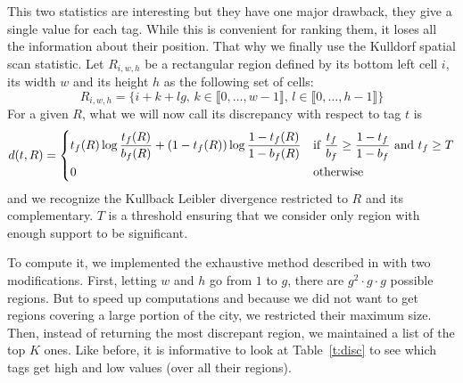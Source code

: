 This two statistics are interesting but they have one major drawback, they
give a single value for each tag. While this is convenient for ranking them,
it loses all the information about their position. That why we finally use the
Kulldorf spatial scan statistic\cite{kulldorff}. Let $R_{i,w,h}$ be a
rectangular region defined by its bottom left cell $i$, its width $w$ and its
height $h$ as the following set of cells: \[R_{i,w,h} = \{i + k + lg,\,
k\in\llbracket 0,\dots, w-1\rrbracket,\, l\in\llbracket 0,\dots,
h-1\rrbracket\}\] For a given $R$, what we will now call its discrepancy with
respect to tag $t$ is
\[
	d(t, R) =
\begin{dcases}
	t_f(R)\log\frac{t_f(R)}{b_f(R)} + (1-t_f(R))\log\frac{1-t_f(R)}{1-b_f(R)}
	& \text{if } \frac{t_f}{b_f} \geq \frac{1-t_f}{1-b_f} \text{ and } t_f \geq T\\
	0 & \text{otherwise}
\end{dcases}
\]
and we recognize the Kullback Leibler divergence restricted to $R$ and its
complementary. $T$ is a threshold ensuring that we consider only region with
enough support to be significant.

To compute it, we implemented the exhaustive method described in
\citep[Algorithm 3]{Agarwal2006spatial} with two modifications. First, letting
$w$ and $h$ go from $1$ to $g$, there are $g^2\cdot g\cdot g$ possible
regions. But to speed up computations and because we did not want to get
regions covering a large portion of the city, we restricted their maximum
size. Then, instead of returning the most discrepant region, we maintained a
list of the top $K$ ones. Like before, it is informative to look at
Table~\vref{t:disc} to see which tags get high and low values (over all their
regions).


